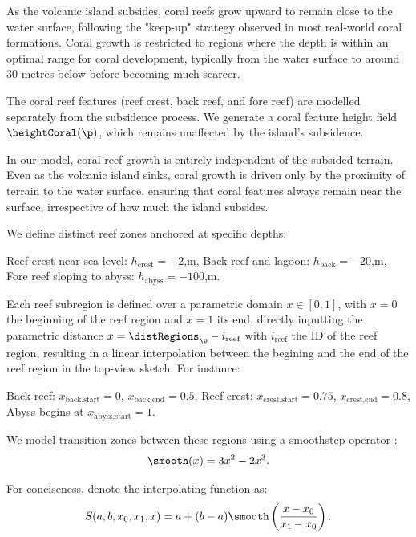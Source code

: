 As the volcanic island subsides, coral reefs grow upward to remain close to the water surface, following the "keep-up" strategy observed in most real-world coral formations. Coral growth is restricted to regions where the depth is within an optimal range for coral development, typically from the water surface to around 30 metres below before becoming much scarcer.

The coral reef features (reef crest, back reef, and fore reef) are modelled separately from the subsidence process. We generate a coral feature height field $\heightCoral(\p)$, which remains unaffected by the island's subsidence. %

In our model, coral reef growth is entirely independent of the subsided terrain. Even as the volcanic island sinks, coral growth is driven only by the proximity of terrain to the water surface, ensuring that coral features always remain near the surface, irrespective of how much the island subsides.

We define distinct reef zones anchored at specific depths:
\begin{Itemize}
    \Item{} Reef crest near sea level: $h_\text{crest} = -2$,m,
    \Item{} Back reef and lagoon: $h_\text{back} = -20$,m,
    \Item{} Fore reef sloping to abyss: $h_\text{abyss} = -100$,m.
\end{Itemize}

Each reef subregion is defined over a parametric domain $x \in [0, 1]$, with $x = 0$ the beginning of the reef region and $x = 1$ its end, directly inputting the parametric distance $x = \distRegions_\p - i_{\text{reef}}$ with $i_\text{reef}$ the ID of the reef region, resulting in a linear interpolation between the begining and the end of the reef region in the top-view sketch. For instance:
\begin{Itemize}
    \Item{} Back reef: $x_{\text{back,start}} = 0$, $x_{\text{back,end}} = 0.5$,
    \Item{} Reef crest: $x_{\text{crest,start}} = 0.75$, $x_{\text{crest,end}} = 0.8$,
    \Item{} Abyss begins at $x_{\text{abyss,start}} = 1$.
\end{Itemize}

We model transition zones between these regions using a smoothstep operator \cite{Perlin2002}:
\begin{align*}
    \smooth(x) = 3x^2 - 2x^3.
\end{align*}

For conciseness, denote the interpolating function as:
\begin{align*}
    S(a, b, x_0, x_1, x) = a + (b-a) \smooth\left(\frac{x - x_0}{x_1 - x_0}\right).
\end{align*}


